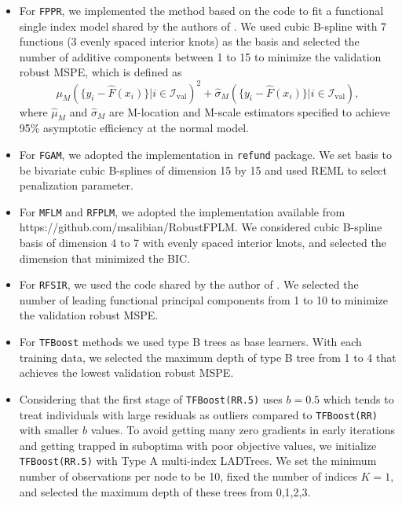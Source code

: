 \documentclass{article}
\begin{document}
\begin{itemize}
	\item For \texttt{FPPR}, we implemented the method based on the code to fit a functional single index model shared by  the authors of \cite{ferraty2013functional}.  We used cubic B-spline with 7 functions (3 evenly spaced interior knots) as the basis and selected the number of additive components between 1 to 15 to minimize the validation  robust  MSPE, which is defined as
	$$\mu_M( \{y_i - \hat{F}(x_i)\}|i \in \mathcal{I}_{\text{val}})^2 + \hat{\sigma}_M(  \{y_i - \hat{F}(x_i)\}|i \in \mathcal{I}_{\text{val}}),$$
	where  $\hat{\mu}_M$ and $\hat{\sigma}_M$ are M-location and M-scale estimators specified to achieve 95\% asymptotic efficiency at the normal model. 
	\item For \texttt{FGAM},  we adopted the implementation in \texttt{refund} package. We set basis to be bivariate cubic B-splines of dimension 15 by 15 and used REML to select penalization parameter. 
	\item For \texttt{MFLM} and \texttt{RFPLM}, we adopted the implementation available from \\ https://github.com/msalibian/RobustFPLM. We considered cubic B-spline basis of dimension 4 to 7 with evenly spaced interior knots, and selected the dimension that minimized the BIC. 
	\item For \texttt{RFSIR}, we used the code shared by the author of \cite{wang2017robust}. We selected the number of leading functional principal components from 1 to 10 to minimize the validation  robust  MSPE. 
	\item For \texttt{TFBoost} methods  we used type B trees as base learners. With each training data, we selected the maximum depth of type B tree from 1 to 4 that achieves the lowest validation robust MSPE. 
	\item Considering that the first stage of \texttt{TFBoost(RR.5)} uses $b =  0.5$ which tends to treat individuals with large residuals as outliers compared to \texttt{TFBoost(RR)} with smaller $b$ values. 
	To avoid getting many zero gradients in early iterations and getting trapped in suboptima with poor objective values, we 
 initialize \texttt{TFBoost(RR.5)} with  Type A multi-index LADTrees. We set the minimum number of observations per node to be 10, fixed the number of indices $K = 1$, and selected the maximum depth of these trees from 0,1,2,3. 	
	

\end{itemize}
\end{document}
